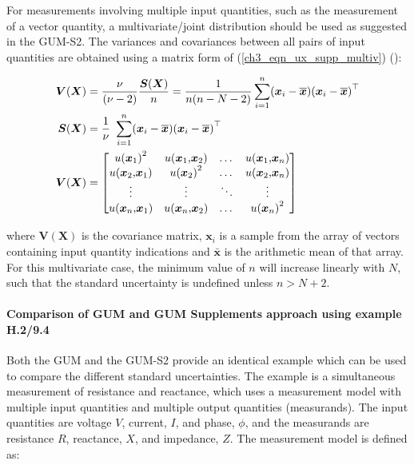 \documentclass[../thesis/thesis.tex]{subfiles}
\begin{document}
For measurements involving multiple input quantities, such as the measurement of a vector quantity, a multivariate/joint distribution should be used as suggested in the GUM-S2. The variances and covariances between all pairs of input quantities are obtained using a matrix form of (\ref{ch3_eqn_ux_supp_multiv}) (\cite[Section~5.3.2]{GUM_S2}):

\begin{align}
\boldsymbol V(\boldsymbol X) & = \frac\nu{(\nu-2)}\frac{\boldsymbol S(\boldsymbol X)}n=\frac1{n(n-N-2)}\sum_{i=1}^n({\boldsymbol x}_i-\overline{\boldsymbol x}){({\boldsymbol x}_i-\overline{\boldsymbol x})}^\top
\\
\boldsymbol S(\boldsymbol X) & = \frac1\nu\hspace{0.35em}\sum_{i=1}^n({\boldsymbol x}_i-\overline{\boldsymbol x}){({\boldsymbol x}_i-\overline{\boldsymbol x})}^\top
\\
\boldsymbol V(\boldsymbol X) & = 
\begin{bmatrix}
u{({\boldsymbol x}_1)}^2&u({\boldsymbol x}_1\text{,}{\boldsymbol x}_2)&\dots&u({\boldsymbol x}_1\text{,}{\boldsymbol x}_n)\\
u({\boldsymbol x}_2\text{,}{\boldsymbol x}_1)&u{({\boldsymbol x}_2)}^2&\dots&u({\boldsymbol x}_2\text{,}{\boldsymbol x}_n)\\
\vdots&\vdots&\ddots&\vdots\\
u({\boldsymbol x}_n\text{,}{\boldsymbol x}_1)&u({\boldsymbol x}_n\text{,}{\boldsymbol x}_2)&\dots&u{({\boldsymbol x}_n)}^2
\end{bmatrix}
\end{align}

where $\boldsymbol V(\boldsymbol X)$ is the covariance matrix, $\bm{x}_i$ is a sample from the array of vectors containing input quantity indications and $\bar{\bm{x}}$ is the arithmetic mean of that array. For this multivariate case, the minimum value of $n$ will increase linearly with $N$, such that the standard uncertainty is undefined unless $n > N + 2$.

\paragraph{Comparison of GUM and GUM Supplements approach using example H.2/9.4}

Both the GUM and the GUM-S2 provide an identical example which can be used to compare the different standard uncertainties. The example is a simultaneous measurement of resistance and reactance, which uses a measurement model with multiple input quantities and multiple output quantities (measurands). The input quantities are voltage $V$, current, $I$, and phase, $\phi$, and the measurands are resistance $R$, reactance, $X$, and impedance, $Z$. The measurement model is defined as:
\end{document}
